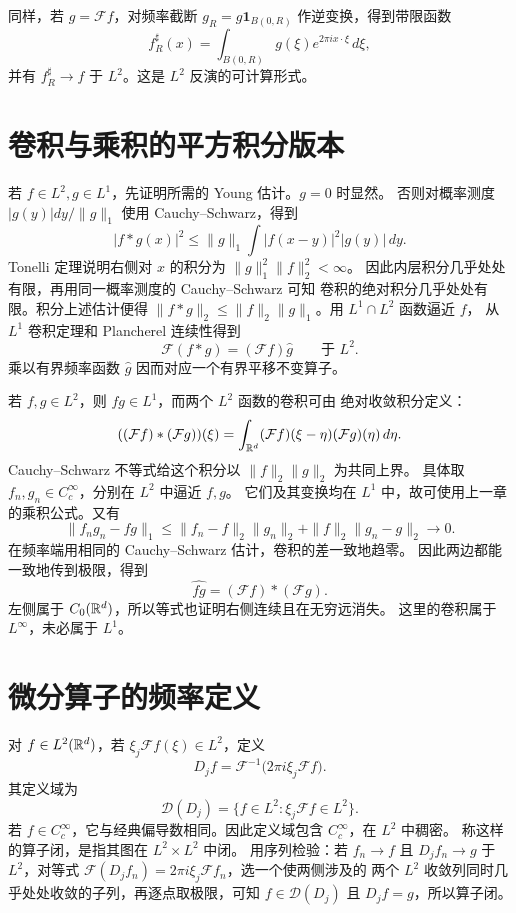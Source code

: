 同样，若 \(g=\mathcal Ff\)，对频率截断
\(g_R=g\mathbf1_{B(0,R)}\) 作逆变换，得到带限函数
\[
 f_R^\sharp(x)=\int_{B(0,R)}g(\xi)e^{2\pi ix\cdot\xi}\,d\xi,
\]
并有 \(f_R^\sharp\to f\) 于 \(L^2\)。这是 \(L^2\) 反演的可计算形式。

\section{卷积与乘积的平方积分版本}

若 \(f\in L^2,g\in L^1\)，先证明所需的 Young 估计。\(g=0\) 时显然。
否则对概率测度 \(|g(y)|dy/\|g\|_1\) 使用 Cauchy--Schwarz，得到
\[
 |f*g(x)|^2\le\|g\|_1\int|f(x-y)|^2|g(y)|\,dy.
\]
Tonelli 定理说明右侧对 \(x\) 的积分为 \(\|g\|_1^2\|f\|_2^2<\infty\)。
因此内层积分几乎处处有限，再用同一概率测度的 Cauchy--Schwarz 可知
卷积的绝对积分几乎处处有限。积分上述估计便得
\(\|f*g\|_2\le\|f\|_2\|g\|_1\)。用 \(L^1\cap L^2\) 函数逼近 \(f\)，
从 \(L^1\) 卷积定理和 Plancherel 连续性得到
\begin{equation}\label{eq:plancherel-convolution}
 \mathcal F(f*g)=(\mathcal Ff)\widehat g\qquad\text{于 }L^2.
\end{equation}
乘以有界频率函数 \(\widehat g\) 因而对应一个有界平移不变算子。

若 \(f,g\in L^2\)，则 \(fg\in L^1\)，而两个 \(L^2\) 函数的卷积可由
绝对收敛积分定义：
\[
 ((\mathcal Ff)*(\mathcal Fg))(\xi)
 =\int_{\mathbb{R}^d}(\mathcal Ff)(\xi-\eta)(\mathcal Fg)(\eta)\,d\eta.
\]
Cauchy--Schwarz 不等式给这个积分以 \(\|f\|_2\|g\|_2\) 为共同上界。
具体取 \(f_n,g_n\in C_c^\infty\)，分别在 \(L^2\) 中逼近 \(f,g\)。
它们及其变换均在 \(L^1\) 中，故可使用上一章的乘积公式。又有
\[
 \|f_ng_n-fg\|_1
 \le\|f_n-f\|_2\|g_n\|_2+\|f\|_2\|g_n-g\|_2\longrightarrow0.
\]
在频率端用相同的 Cauchy--Schwarz 估计，卷积的差一致地趋零。
因此两边都能一致地传到极限，得到
\[
 \widehat{fg}=(\mathcal Ff)*(\mathcal Fg).
\]
左侧属于 \(C_0(\mathbb{R}^d)\)，所以等式也证明右侧连续且在无穷远消失。
这里的卷积属于 \(L^\infty\)，未必属于
\(L^1\)。

\section{微分算子的频率定义}

对 \(f\in L^2(\mathbb{R}^d)\)，若
\(\xi_j\mathcal Ff(\xi)\in L^2\)，定义
\[
 D_jf=\mathcal F^{-1}\bigl(2\pi i\xi_j\mathcal Ff\bigr).
\]
其定义域为
\[
 \mathcal D(D_j)=
 \{f\in L^2:\xi_j\mathcal Ff\in L^2\}.
\]
若 \(f\in C_c^\infty\)，它与经典偏导数相同。因此定义域包含
\(C_c^\infty\)，在 \(L^2\) 中稠密。
称这样的算子闭，是指其图在 \(L^2\times L^2\) 中闭。
用序列检验：若
\(f_n\to f\) 且 \(D_jf_n\to g\) 于 \(L^2\)，对等式
\(\mathcal F(D_jf_n)=2\pi i\xi_j\mathcal Ff_n\)，选一个使两侧涉及的
两个 \(L^2\) 收敛列同时几乎处处收敛的子列，再逐点取极限，可知
\(f\in\mathcal D(D_j)\) 且 \(D_jf=g\)，所以算子闭。

